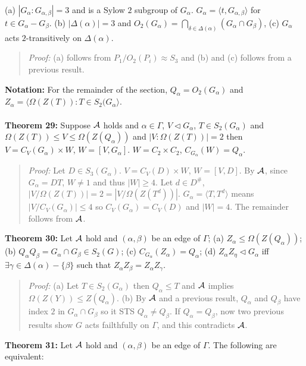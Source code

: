 (a) $|G_{\alpha}:G_{\alpha, \beta}|=3$ and is a Sylow $2$ subgroup of $G_{\alpha}$.
$G_{\alpha} = \langle t, G_{\alpha, \beta} \rangle$ for $t \in G_{\alpha} - G_{\beta}$.
(b) $|\Delta( \alpha )| =3$ and $O_2(G_{\alpha})= \bigcap_{\delta \in \Delta( \alpha )} (G_{\alpha} \cap G_{\beta})$,
(c) $G_{\alpha}$ acts $2$-transitively on $\Delta( \alpha )$.
\begin{quote}
\emph{Proof:}  (a) follows from $P_1/O_2(P_i) \approx S_3$ and (b) and (c) follows from a previous result.
\end{quote}
{\bf Notation:}
For the remainder of the section, $Q_{\alpha}= O_2(G_{\alpha})$ and
$Z_{\alpha}= \langle \Omega(Z(T)): T \in S_2(G_{\alpha} \rangle$.
\\
\\
{\bf Theorem 29:}
Suppose ${\cal A}$ holds and $\alpha \in \Gamma$, $V \lhd G_{\alpha}$, $T \in S_2(G_{\alpha})$ and
$\Omega(Z(T)) \leq V \leq \Omega(Z(Q_{\alpha}))$ and $|V:\Omega(Z(T))|= 2$
then
$V= C_V(G_{\alpha}) \times W$, $W= [V, G_{\alpha}]$. $W= C_2 \times C_2$,
$C_{G_{\alpha}}(W)= Q_{\alpha}$.  \begin{quote}
\emph{Proof:}  Let $D \in S_3(G_{\alpha})$.  $V= C_V(D) \times W$, $W= [V,D]$.  By ${\cal A}$, since
$G_{\alpha}= DT$, $W \neq 1$ and thus $|W| \geq 4$.   Let $d \in D^{\#}$,
$|V/ \Omega(Z(T))|=2=|V/ \Omega(Z(T^d))|$.  $G_{\alpha}= \langle T, T^d \rangle$ means
$|V/C_V(G_{\alpha})| \leq 4$ so $C_V( G_{\alpha}) = C_V(D)$ and $|W|=4$.  The remainder follows from
${\cal A}$.
\end{quote}
{\bf Theorem 30:}
Let ${\cal A}$ hold and $(\alpha, \beta)$ be an edge of $\Gamma$;
(a) $Z_{\alpha} \leq \Omega(Z(Q_{\alpha}))$;
(b) $Q_{\alpha} Q_{\beta} = G_{\alpha} \cap G_{\beta} \in S_2(G)$;
(c) $C_{G_{\alpha}}(Z_{\alpha}) = Q_{\alpha}$;
(d) $Z_{\alpha}Z_{\eta} \lhd G_{\alpha}$ iff $\exists \gamma \in \Delta( \alpha) - \{ \beta \}$ such that
$Z_{\alpha}Z_{\beta} = Z_{\alpha}Z_{\gamma} $.
\begin{quote}
\emph{Proof:}  (a) Let $T \in S_2(G_{\alpha})$ then $Q_{\alpha} \leq T$ and ${\cal A}$ implies $\Omega(Z(Y)) \leq Z(Q_{\alpha})$.
(b) By ${\cal A}$ and a previous result, $Q_{\alpha}$ and $Q_{\beta}$ have index $2$ in $G_{\alpha} \cap G_{\beta}$ so it STS $
Q_{\alpha} \neq Q_{\beta} $.
If $Q_{\alpha} = Q_{\beta} $, now two previous results show
$G$ acts failthfully on $\Gamma$, and this contradicts ${\cal A}$.
\end{quote}
{\bf Theorem 31:}
Let ${\cal A}$ hold and $(\alpha, \beta)$ be an edge of $\Gamma$.  The following are equivalent:
